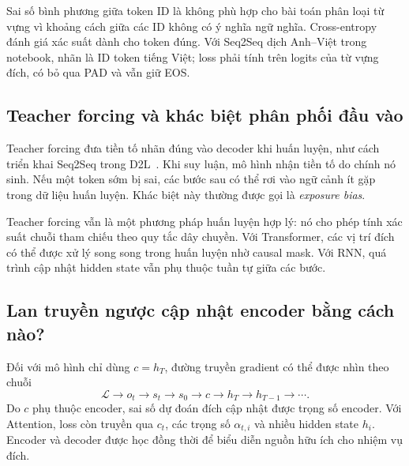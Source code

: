 \documentclass[11pt,a4paper]{article}
\numberwithin{equation}{section}
\begin{document}
Sai số bình phương giữa token ID là không phù hợp cho bài toán phân loại từ vựng vì khoảng cách giữa các ID không có ý nghĩa ngữ nghĩa. Cross-entropy đánh giá xác suất dành cho token đúng. Với Seq2Seq dịch Anh--Việt trong notebook, nhãn là ID token tiếng Việt; loss phải tính trên logits của từ vựng đích, có bỏ qua PAD và vẫn giữ EOS.

\subsection{Teacher forcing và khác biệt phân phối đầu vào}
Teacher forcing đưa tiền tố nhãn đúng vào decoder khi huấn luyện, như cách triển khai Seq2Seq trong D2L~\cite{d2lseq}. Khi suy luận, mô hình nhận tiền tố do chính nó sinh. Nếu một token sớm bị sai, các bước sau có thể rơi vào ngữ cảnh ít gặp trong dữ liệu huấn luyện. Khác biệt này thường được gọi là \emph{exposure bias}.

Teacher forcing vẫn là một phương pháp huấn luyện hợp lý: nó cho phép tính xác suất chuỗi tham chiếu theo quy tắc dây chuyền. Với Transformer, các vị trí đích có thể được xử lý song song trong huấn luyện nhờ causal mask. Với RNN, quá trình cập nhật hidden state vẫn phụ thuộc tuần tự giữa các bước.

\subsection{Lan truyền ngược cập nhật encoder bằng cách nào?}
Đối với mô hình chỉ dùng $c=h_T$, đường truyền gradient có thể được nhìn theo chuỗi
\begin{equation*}
\mathcal L\longrightarrow o_t\longrightarrow s_t\longrightarrow s_0
\longrightarrow c\longrightarrow h_T\longrightarrow h_{T-1}\longrightarrow\cdots.
\end{equation*}
Do $c$ phụ thuộc encoder, sai số dự đoán đích cập nhật được trọng số encoder. Với Attention, loss còn truyền qua $c_t$, các trọng số $\alpha_{t,i}$ và nhiều hidden state $h_i$. Encoder và decoder được học đồng thời để biểu diễn nguồn hữu ích cho nhiệm vụ đích.
\end{document}
